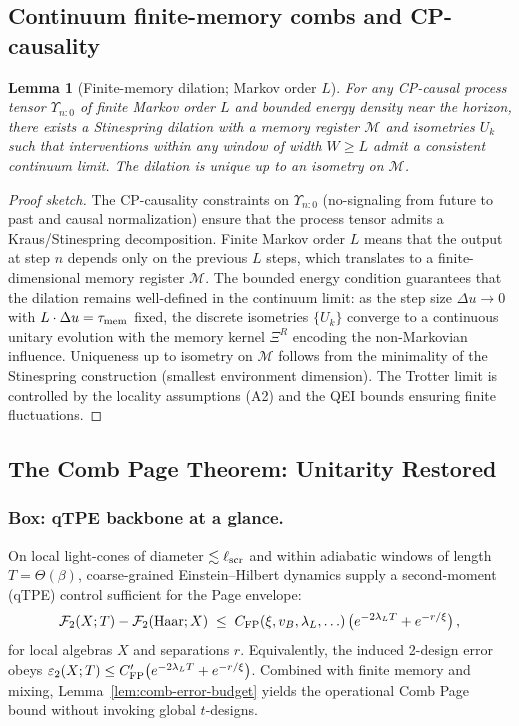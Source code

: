 \documentclass[aps,prd,preprint,onecolumn,superscriptaddress,nofootinbib,longbibliography,floatfix,11pt,showpacs,showkeys]{revtex4-2}
\theoremstyle{plain}
\newtheorem{lemma}[theorem]{Lemma}
\theoremstyle{definition}
\theoremstyle{remark}
\begin{document}
\subsection*{Continuum finite-memory combs and CP-causality}
\begin{lemma}[Finite-memory dilation; Markov order $L$]\label{lem:finite-memory-dilation}
For any CP-causal process tensor $\Upsilon_{n:0}$ of finite Markov order $L$ and bounded energy density
near the horizon, there exists a Stinespring dilation with a memory register $\mathcal{M}$ and isometries $U_k$
such that interventions within any window of width $W\!\ge\!L$ admit a consistent continuum limit. The dilation
is unique up to an isometry on $\mathcal{M}$.
\end{lemma}
\begin{proof}[Proof sketch]
The CP-causality constraints on $\Upsilon_{n:0}$ (no-signaling from future to past and causal normalization) ensure that the process tensor admits a Kraus/Stinespring decomposition. Finite Markov order $L$ means that the output at step $n$ depends only on the previous $L$ steps, which translates to a finite-dimensional memory register $\mathcal{M}$. The bounded energy condition guarantees that the dilation remains well-defined in the continuum limit: as the step size $\Delta u\to 0$ with $L\cdot\Delta u=\tau_{\rm mem}$ fixed, the discrete isometries $\{U_k\}$ converge to a continuous unitary evolution with the memory kernel $\Xi^R$ encoding the non-Markovian influence. Uniqueness up to isometry on $\mathcal{M}$ follows from the minimality of the Stinespring construction (smallest environment dimension). The Trotter limit is controlled by the locality assumptions (A2) and the QEI bounds ensuring finite fluctuations.
\end{proof}

\subsection{The Comb Page Theorem: Unitarity Restored}
\label{sec:page_theorem}\label{sec:comb-page}

\subsubsection{Box: qTPE backbone at a glance.}
On local light-cones of diameter \(\lesssim \ell_{\rm scr}\) and within adiabatic windows of length \(T=\Theta(\beta)\),
coarse-grained Einstein--Hilbert dynamics supply a second-moment (qTPE) control sufficient for the Page envelope:
\begin{align*}
\mathcal{F}_2(X;T)-\mathcal{F}_2(\mathrm{Haar};X) \;\le\; C_{\rm FP}(\xi,v_B,\lambda_L,\ldots)\,\big(e^{-2\lambda_L T}+e^{-r/\xi}\big)\,,
\end{align*}
for local algebras \(X\) and separations \(r\). Equivalently, the induced 2-design error obeys
\(\varepsilon_2(X;T)\le C'_{\rm FP}\big(e^{-2\lambda_L T}+e^{-r/\xi}\big)\).
Combined with finite memory and mixing, Lemma~\ref{lem:comb-error-budget} yields the operational Comb Page bound without invoking global \(t\)-designs.
\end{document}
